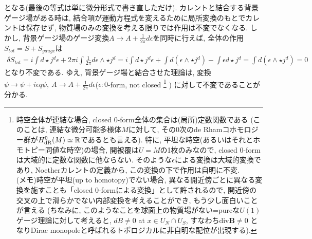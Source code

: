 となる(最後の等式は単に微分形式で書き直しただけ). 
カレントと結合する背景ゲージ場がある時は, 結合項が運動方程式を変えるために局所変換のもとでカレントは保存せず, 
物質場のみの変換を考える限りでは作用は不変でなくなる. 
しかし, 
背景ゲージ場のゲージ変換$A\to A + \frac{1}{2\pi}d\epsilon$を同時に行えば, 
全体の作用$S_{tot} = S + S_{gauge}$は
\begin{align}
    \delta S_{tot} = i\int d\star j^{d} \epsilon  +  2\pi i\int \frac{1}{2\pi}d\epsilon \wedge \star j^d
    =i\int d\star j^{d} \epsilon + \int d(\epsilon \wedge \star j^d) - \int \epsilon d \star j^{d}
    =\int d(\epsilon \wedge \star j^d) = 0
\end{align}
となり不変である. 
ゆえ, 背景ゲージ場と結合させた理論は, 変換
$\psi \to \psi + i\epsilon q \psi, ~ A\to A + \frac{1}{2\pi}d\epsilon$($\epsilon: 0$-form, not closed
\footnote{時空全体が連結な場合, closed $0$-form全体の集合は(局所)定数関数である
(このことは, 連結な微分可能多様体$M$に対して, 
その$0$次のde Rhamコホモロジー群が$H^{0}_{\mathrm{dR}}(M)\simeq \mathbb{R}$であるとも言える). 
特に, 平坦な時空(あるいはそれとホモトピー同値な時空)の場合, 開被覆は$U=M$の1枚のみなので, closed $0$-formは大域的に定数な関数に他ならない. 
そのような$\epsilon$による変換は大域的変換であり, Noetherカレントの定義から, この変換の下で作用は自明に不変. \\
(メモ)時空が平坦(up to homotopy)でない場合, 異なる開近傍ごとに異なる変換を施すことも「closed $0$-formによる変換」として許されるので, 
開近傍の交叉の上で滑らかでない内部変換を考えることができ, もう少し面白いことが言える
(ちなみに, このようなことを球面上の物質場がない=pureな$U(1)$ゲージ理論に対して考えると, $dB\neq 0$ at $x\in U_{N}\cap U_{S}$, すなわち$\mathrm{div} \bm{B}\neq 0$
となりDirac monopoleと呼ばれるトポロジカルに非自明な配位が出現する). 
}
)
に対して不変であることが分かる. 
